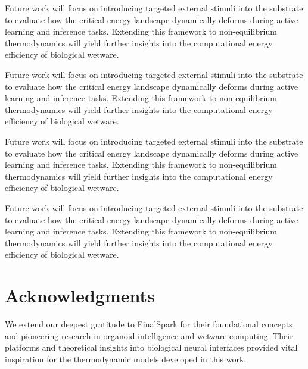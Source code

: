 \documentclass[11pt,a4paper]{article}
\begin{document}
Future work will focus on introducing targeted external stimuli into the substrate to evaluate how the critical energy landscape dynamically deforms during active learning and inference tasks. Extending this framework to non-equilibrium thermodynamics will yield further insights into the computational energy efficiency of biological wetware.

Future work will focus on introducing targeted external stimuli into the substrate to evaluate how the critical energy landscape dynamically deforms during active learning and inference tasks. Extending this framework to non-equilibrium thermodynamics will yield further insights into the computational energy efficiency of biological wetware.

Future work will focus on introducing targeted external stimuli into the substrate to evaluate how the critical energy landscape dynamically deforms during active learning and inference tasks. Extending this framework to non-equilibrium thermodynamics will yield further insights into the computational energy efficiency of biological wetware.

Future work will focus on introducing targeted external stimuli into the substrate to evaluate how the critical energy landscape dynamically deforms during active learning and inference tasks. Extending this framework to non-equilibrium thermodynamics will yield further insights into the computational energy efficiency of biological wetware.


\section*{Acknowledgments}
We extend our deepest gratitude to FinalSpark for their foundational concepts and pioneering research in organoid intelligence and wetware computing. Their platforms and theoretical insights into biological neural interfaces provided vital inspiration for the thermodynamic models developed in this work.
\end{document}
